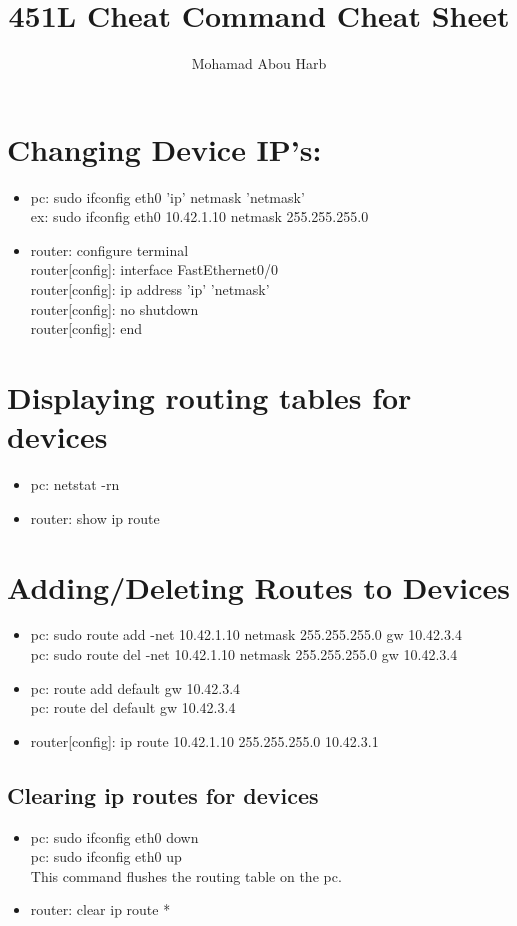 \documentclass[12pt]{article}
\title{451L Cheat Command Cheat Sheet}
\author{Mohamad Abou Harb}
\begin{document}
\maketitle
\tableofcontents
\newpage
\section{Changing Device IP's:}
\begin{itemize}
    \item pc: sudo ifconfig eth0 'ip' netmask 'netmask'\\
          ex: sudo ifconfig eth0 10.42.1.10 netmask 255.255.255.0
    \item router: configure terminal\\
          router[config]: interface FastEthernet0/0\\
          router[config]: ip address 'ip' 'netmask'\\
          router[config]: no shutdown\\
          router[config]: end\\
\end{itemize}
\newpage

\section{Displaying routing tables for devices}
\begin{itemize}
    \item pc: netstat -rn
    \item router: show ip route
\end{itemize}
\newpage
\section{Adding/Deleting Routes to Devices}
\begin{itemize}
    \item pc: sudo route add -net 10.42.1.10 netmask 255.255.255.0 gw 10.42.3.4\\
          pc: sudo route del -net 10.42.1.10 netmask 255.255.255.0 gw 10.42.3.4
    \item pc: route add default gw 10.42.3.4\\
          pc: route del default gw 10.42.3.4
    \item router[config]: ip route 10.42.1.10 255.255.255.0 10.42.3.1
\end{itemize}
\subsection{Clearing ip routes for devices}
\begin{itemize}
    \item pc: sudo ifconfig eth0 down\\
          pc: sudo ifconfig eth0 up\\
          This command flushes the routing table on the pc.
    \item router: clear ip route *
\end{itemize}
\newpage
\end{document}
